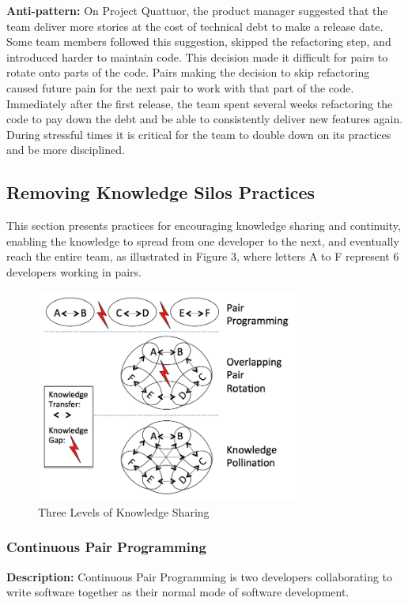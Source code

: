 \textbf{Anti-pattern:} On Project Quattuor, the product manager suggested that the team deliver more stories at the cost of technical debt to make a release date. Some team members followed this suggestion, skipped the refactoring step, and introduced harder to maintain code. This decision made it difficult for pairs to rotate onto parts of the code. Pairs making the decision to skip refactoring caused future pain for the next pair to work with that part of the code. Immediately after the first release, the team spent several weeks refactoring the code to pay down the debt and be able to consistently deliver new features again. During stressful times it is critical for the team to double down on its practices and be more disciplined.
\subsection{Removing Knowledge Silos Practices}
This section presents practices for encouraging knowledge sharing and continuity, enabling the knowledge to spread from one developer to the next, and eventually reach the entire team, as illustrated in Figure 3, where letters A to F represent 6 developers working in pairs.

\begin{figure}[t]
\centering
\includegraphics[width=3.4in]{KnowledgeSharingLevels.png}
\caption{Three Levels of Knowledge Sharing}
\label{KnowledgeSharing}
\end{figure}

\subsubsection{Continuous Pair Programming}
\textbf{Description:} Continuous Pair Programming is two developers collaborating to write software together as their normal mode of software development.

